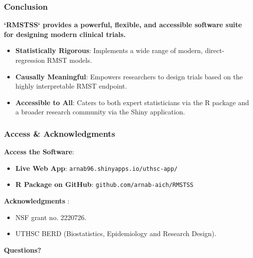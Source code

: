 \documentclass{beamer}
\begin{document}
\begin{frame}
\frametitle{Conclusion}
\textbf{`RMSTSS` provides a powerful, flexible, and accessible software suite for designing modern clinical trials.}
\begin{itemize}
    \item \textbf{Statistically Rigorous}: Implements a wide range of modern, direct-regression RMST models.
    \item \textbf{Causally Meaningful}: Empowers researchers to design trials based on the highly interpretable RMST endpoint.
    \item \textbf{Accessible to All}: Caters to both expert statisticians via the R package and a broader research community via the Shiny application.
\end{itemize}
\end{frame}

\begin{frame}
\frametitle{Access \& Acknowledgments}
\textbf{Access the Software}:
\begin{itemize}
    \item \textbf{Live Web App}: \texttt{arnab96.shinyapps.io/uthsc-app/}
    \item \textbf{R Package on GitHub}: \texttt{github.com/arnab-aich/RMSTSS}
\end{itemize}
\vspace{1em}
\textbf{Acknowledgments} \cite{[1]}:
\begin{itemize}
    \item NSF grant no. 2220726.
    \item UTHSC BERD (Biostatistics, Epidemiology and Research Design).
\end{itemize}
\vfill
\begin{center}
\Huge{\textbf{Questions?}}
\end{center}
\end{frame}
\end{document}
